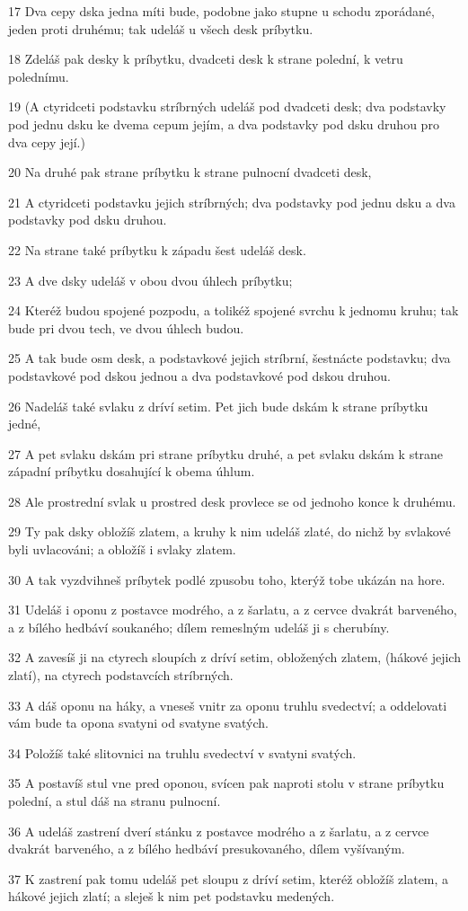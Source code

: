 \par 17 Dva cepy dska jedna míti bude, podobne jako stupne u schodu zporádané, jeden proti druhému; tak udeláš u všech desk príbytku.
\par 18 Zdeláš pak desky k príbytku, dvadceti desk k strane polední, k vetru polednímu.
\par 19 (A ctyridceti podstavku stríbrných udeláš pod dvadceti desk; dva podstavky pod jednu dsku ke dvema cepum jejím, a dva podstavky pod dsku druhou pro dva cepy její.)
\par 20 Na druhé pak strane príbytku k strane pulnocní dvadceti desk,
\par 21 A ctyridceti podstavku jejich stríbrných; dva podstavky pod jednu dsku a dva podstavky pod dsku druhou.
\par 22 Na strane také príbytku k západu šest udeláš desk.
\par 23 A dve dsky udeláš v obou dvou úhlech príbytku;
\par 24 Kteréž budou spojené pozpodu, a tolikéž spojené svrchu k jednomu kruhu; tak bude pri dvou tech, ve dvou úhlech budou.
\par 25 A tak bude osm desk, a podstavkové jejich stríbrní, šestnácte podstavku; dva podstavkové pod dskou jednou a dva podstavkové pod dskou druhou.
\par 26 Nadeláš také svlaku z dríví setim. Pet jich bude dskám k strane príbytku jedné,
\par 27 A pet svlaku dskám pri strane príbytku druhé, a pet svlaku dskám k strane západní príbytku dosahující k obema úhlum.
\par 28 Ale prostrední svlak u prostred desk provlece se od jednoho konce k druhému.
\par 29 Ty pak dsky obložíš zlatem, a kruhy k nim udeláš zlaté, do nichž by svlakové byli uvlacováni; a obložíš i svlaky zlatem.
\par 30 A tak vyzdvihneš príbytek podlé zpusobu toho, kterýž tobe ukázán na hore.
\par 31 Udeláš i oponu z postavce modrého, a z šarlatu, a z cervce dvakrát barveného, a z bílého hedbáví soukaného; dílem remeslným udeláš ji s cherubíny.
\par 32 A zavesíš ji na ctyrech sloupích z dríví setim, obložených zlatem, (hákové jejich zlatí), na ctyrech podstavcích stríbrných.
\par 33 A dáš oponu na háky, a vneseš vnitr za oponu truhlu svedectví; a oddelovati vám bude ta opona svatyni od svatyne svatých.
\par 34 Položíš také slitovnici na truhlu svedectví v svatyni svatých.
\par 35 A postavíš stul vne pred oponou, svícen pak naproti stolu v strane príbytku polední, a stul dáš na stranu pulnocní.
\par 36 A udeláš zastrení dverí stánku z postavce modrého a z šarlatu, a z cervce dvakrát barveného, a z bílého hedbáví presukovaného, dílem vyšívaným.
\par 37 K zastrení pak tomu udeláš pet sloupu z dríví setim, kteréž obložíš zlatem, a hákové jejich zlatí; a sleješ k nim pet podstavku medených.

